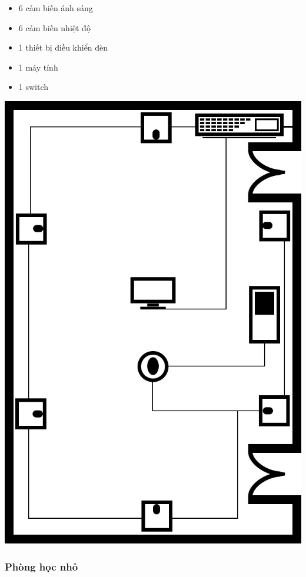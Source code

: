 \documentclass[12pt]{report}
\begin{document}
			\begin{itemize}
				\item 6 cảm biến ánh sáng
				\item 6 cảm biến nhiệt độ
				\item 1 thiết bị điều khiển đèn
				\item 1 máy tính
				\item 1 switch
			\end{itemize}
		
			\begin{center}
				\includegraphics[scale=0.3]{roomBig.jpg} \\
			\end{center}
		
		\newpage
		\subsubsection{Phòng học nhỏ}
		
\end{document}
